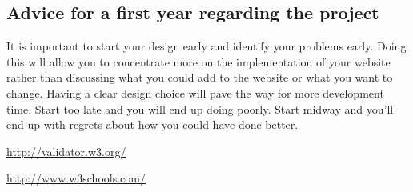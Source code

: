 \documentclass[12pt,a4paper]{article}
\begin{document}
\subsection{Advice for a first year regarding the project}

It is important to start your design early and identify your problems early. Doing this will allow
you to concentrate more on the implementation of your website rather than discussing what you could 
add to the website or what you want to change. Having a clear design choice will pave the way for more
development time. Start too late and you will end up doing poorly. Start midway and you'll end up with regrets
about how you could have done better.

\newpage

\raggedright
\sloppy
\begin{thebibliography}{99}
\url{http://validator.w3.org/}

\url{http://www.w3schools.com/}

\end{thebibliography}
\end{document}
